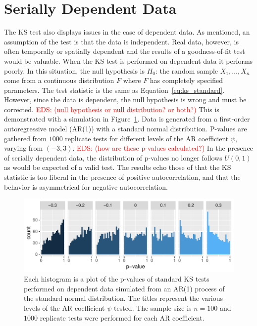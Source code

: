 \documentclass[12pt, letterpaper, titlepage]{article}
\newcommand{\eds}[1]{\textcolor{red}{EDS: (#1)}}
\begin{document}
\section{Serially Dependent Data}
\label{sec:dependence}

The KS test also displays issues in the case of dependent data. As mentioned, an 
assumption of the test is that the data is independent. Real data, however,
is often temporally or spatially dependent and the results of a goodness-of-fit 
test would be valuable. When the KS test is performed on dependent data it 
performs poorly. In this situation, the null hypothesis is $H_0$: the random 
sample $X_1, \ldots, X_n$ come from a continuous distribution $F$ where $F$ has 
completely specified parameters. The test statistic is the same as 
Equation~\eqref{eq:ks_standard}. However, since the data is dependent, the null 
hypothesis is wrong and must be corrected. 
\eds{null hypothesis or null distribution? or both?}
This is demonstrated with a 
simulation in Figure~\ref{fig:hist_correlation}. Data is generated from a 
first-order autoregressive model (AR(1)) with a standard normal distribution. 
P-values are gathered from $1000$ replicate tests for different levels of the 
AR coefficient $\psi$, varying from $(-3,3)$. 
\eds{how are these p-values calculated?}
In the presence of serially 
dependent data, the distribution of p-values no longer follows $U(0, 1)$ as 
would be expected of a valid test. The results echo those of \citet{Durilleul} 
that the KS statistic is too liberal in the presence of positive
autocorrelation, and that the behavior is asymmetrical for negative
 autocorrelation.

\begin{figure}[tbp]
  \centering
  \includegraphics[width=\textwidth]{hist_correlation}
  \caption{Each histogram is a plot of the p-values of standard KS tests
  performed on dependent data simulated from an AR(1) process of the standard 
  normal distribution. The titles represent the various levels of the AR 
  coefficient $\psi$ tested. The sample size is $n = 100$ and $1000$ replicate 
  tests were performed for each AR coefficient.}
  \label{fig:hist_correlation}
\end{figure}
\end{document}
